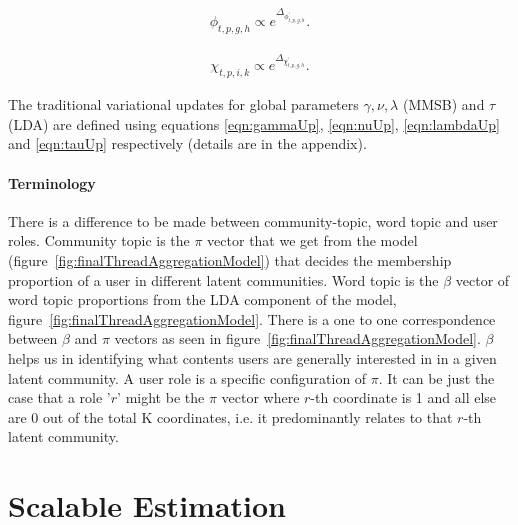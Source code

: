 \documentclass{sig-alternate}
\begin{document}
\begin{align}
\phi_{t,p,g,h} \propto e^{\Delta_{\phi^{'}_{t,p,g,h}}}.
\label{eqn:phiUp}
\end{align}



\begin{align}
\chi_{t,p,i,k} \propto e^{\Delta_{\chi^{'}_{t,p,g,h}}}.
\label{eqn:chiUp}
\end{align}

The traditional variational updates for global parameters $\gamma, \nu, \lambda$
(MMSB) and $\tau$ (LDA) are defined using equations
\ref{eqn:gammaUp}, \ref{eqn:nuUp}, \ref{eqn:lambdaUp} and \ref{eqn:tauUp}
respectively (details are in the appendix).

\paragraph{Terminology} There is a difference to be made between
community-topic, word topic and user roles. Community topic is the 
$\pi$ vector that we get from
the model (figure~\ref{fig:finalThreadAggregationModel}) that decides the 
membership proportion of a user in
different latent communities. Word topic is the $\beta$ vector of word topic
proportions from the LDA component of the model,
figure~\ref{fig:finalThreadAggregationModel}. There is a one to one
correspondence between $\beta$ and $\pi$ vectors as seen in
figure~\ref{fig:finalThreadAggregationModel}. $\beta$ helps us in identifying
what contents users are generally interested in in a given latent community.
 A user role is a specific configuration of $\pi$. It can be just the case
that a role '$r$' might be the $\pi$ vector where $r$-th coordinate is 1
and all else are 0 out of the total K coordinates, i.e. it predominantly relates
to that $r$-th latent community.

\section{Scalable Estimation}
\label{estimation}
\end{document}
